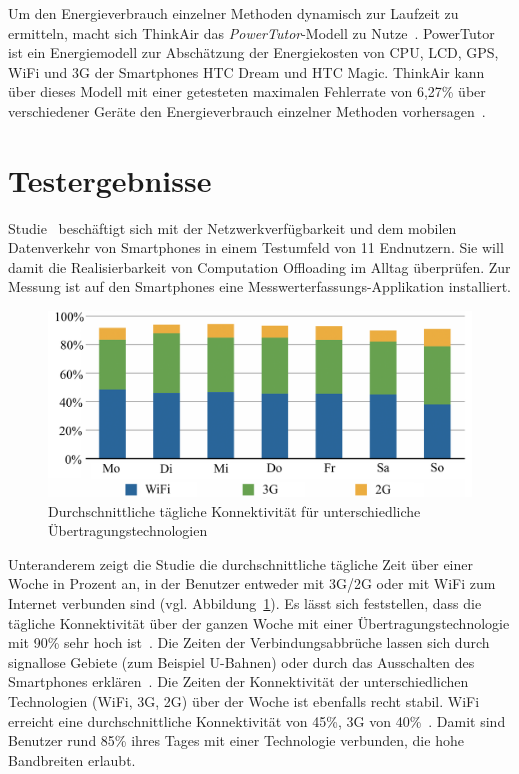 \documentclass{sigchi}
\begin{document}
Um den Energieverbrauch einzelner Methoden dynamisch zur Laufzeit zu ermitteln, macht sich ThinkAir das \emph{PowerTutor}-Modell zu Nutze~\cite{powertutor}.
PowerTutor ist ein Energiemodell zur Abschätzung der Energiekosten von CPU, LCD, GPS, WiFi und 3G der Smartphones HTC Dream und HTC Magic.
ThinkAir kann über dieses Modell mit einer getesteten maximalen Fehlerrate von 6,27\% über verschiedener Geräte den Energieverbrauch einzelner Methoden vorhersagen~\cite{thinkair}.

\section{Testergebnisse}

Studie~\cite{o2} beschäftigt sich mit der Netzwerkverfügbarkeit und dem mobilen Datenverkehr von Smartphones in einem Testumfeld von 11 Endnutzern.
Sie will damit die Realisierbarkeit von Computation Offloading im Alltag überprüfen.
Zur Messung ist auf den Smartphones eine Messwerterfassungs-Applikation installiert.

\begin{figure}
\centering
  \includegraphics[width=1.0\columnwidth]{images/konnektivitaet}
  \caption{Durchschnittliche tägliche Konnektivität für unterschiedliche Übertragungstechnologien~\protect\cite{o2}} \label{fig:konnektivitaet}
\end{figure}

Unteranderem zeigt die Studie die durchschnittliche tägliche Zeit über einer Woche in Prozent an, in der Benutzer entweder mit 3G/2G oder mit WiFi zum Internet verbunden sind (vgl. Abbildung~\ref{fig:konnektivitaet}).
Es lässt sich feststellen, dass die tägliche Konnektivität über der ganzen Woche mit einer Übertragungstechnologie mit 90\% sehr hoch ist~\cite{o2}.
Die Zeiten der Verbindungsabbrüche lassen sich durch signallose Gebiete (zum Beispiel U-Bahnen) oder durch das Ausschalten des Smartphones erklären~\cite{o2}.
Die Zeiten der Konnektivität der unterschiedlichen Technologien (WiFi, 3G, 2G) über der Woche ist ebenfalls recht stabil.
WiFi erreicht eine durchschnittliche Konnektivität von 45\%, 3G von 40\%~\cite{o2}.
Damit sind Benutzer rund 85\% ihres Tages mit einer Technologie verbunden, die hohe Bandbreiten erlaubt.
\end{document}
